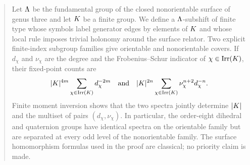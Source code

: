 \begin{abstract}
Let $\LambdaSurf$ be the fundamental group of the closed nonorientable surface
of genus three and let $\K$ be a finite group.  We define a
$\LambdaSurf$-subshift of finite type whose symbols label generator edges by
elements of $\K$ and whose local rule imposes trivial holonomy around the
surface relator.  Two explicit finite-index subgroup families give orientable
and nonorientable covers.  If $d_\chi$ and $\nu_\chi$ are the degree and the
Frobenius--Schur indicator of $\chi\in\Irr(\K)$, their fixed-point counts are
\[
 |\K|^{4m}\sum_{\chi\in\Irr(\K)}d_\chi^{-2m}
 \quad\text{and}\quad
 |\K|^{2n}\sum_{\chi\in\Irr(\K)}
       \nu_\chi^{n+2}d_\chi^{-n}.
\]
Finite moment inversion shows that the two spectra jointly determine $|\K|$
and the multiset of pairs $(d_\chi,\nu_\chi)$.  In particular, the order-eight
dihedral and quaternion groups have identical spectra on the orientable family
but are separated at every odd level of the nonorientable family.  The surface
homomorphism formulas used in the proof are classical; no priority claim is
made.
\end{abstract}

